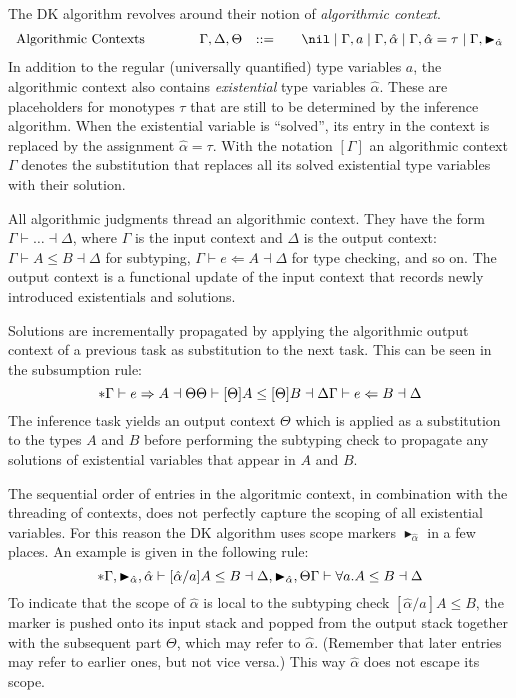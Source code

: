 The DK algorithm revolves around their notion of \emph{algorithmic context}.
\[
\begin{array}{l@{\qquad}lcl}
\text{Algorithmic Contexts}\qquad&\Gamma,\Delta,\Theta &::=&\quad \nil \mid
\Gamma, a \mid \Gamma, \hat{\alpha} \mid \Gamma, \hat{\alpha} = \tau \mid
\Gamma, \blacktriangleright_{\hat{\alpha}}
\end{array}
\]
In addition to the regular (universally quantified) type variables $a$, the
algorithmic context also contains \emph{existential} type variables
$\hat{\alpha}$. These are placeholders for monotypes $\tau$ that are still to
be determined by the inference algorithm. When the existential variable is
``solved'', its entry in the context is replaced by the assignment
$\hat{\alpha} = \tau$. With the notation $[\Gamma]$ an algorithmic context
$\Gamma$ denotes the substitution that replaces all its solved existential type
variables with their solution.

All algorithmic judgments thread an algorithmic context. They have the form
$\Gamma \vdash \ldots \dashv \Delta$, where $\Gamma$ is the input context and
$\Delta$ is the output context:
$\Gamma \vdash A \le B \dashv \Delta$  for subtyping, 
$\Gamma \vdash e \Leftarrow A \dashv \Delta$  for type checking, and so on. 
The output context is a functional update of the input context that records newly
introduced existentials and solutions.

Solutions are incrementally propagated by applying the algorithmic output
context of a previous task as substitution to the next task. This can be seen
in the subsumption rule:
\[
*
  {\Gamma \vdash e \Rightarrow A \dashv \Theta \\ 
   \Theta \vdash [\Theta]A \le [\Theta]B \dashv \Delta
  }
  { \Gamma \vdash e \Leftarrow B \dashv \Delta}
\]
The inference task yields an output context $\Theta$ which is applied as a substitution
to the types $A$ and $B$ before performing the subtyping check to propagate any solutions
of existential variables that appear in $A$ and $B$.

The sequential order of entries in the algoritmic context, in combination with
the threading of contexts,  does not perfectly capture the scoping of all
existential variables. For this reason the DK algorithm uses scope markers
$\blacktriangleright_{\hat{\alpha}}$ in a few places. An example is given in the following
rule:
\[
*
  {\Gamma,\blacktriangleright_{\hat{\alpha}}, \hat{\alpha} \vdash [\hat{\alpha}/a]A \le B \dashv \Delta,\blacktriangleright_{\hat{\alpha}},\Theta}
  {\Gamma \vdash \forall a. A \le B \dashv \Delta}
\]
To indicate that the scope of $\hat{\alpha}$ is local to the subtyping check
$[\hat{\alpha}/a]A \le B$, the marker is pushed onto its input stack and popped
from the output stack together with the subsequent part $\Theta$, which may
refer to $\hat{\alpha}$. (Remember that later entries may refer to earlier
ones, but not vice versa.) This way $\hat{\alpha}$ does not escape its scope.



